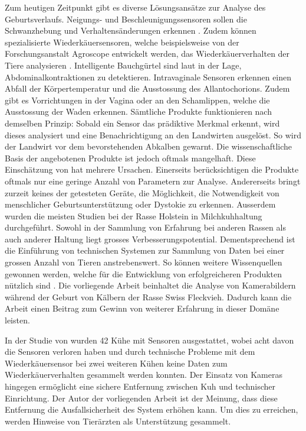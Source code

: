 Zum heutigen Zeitpunkt gibt es diverse Lösungsansätze zur Analyse des Geburtsverlaufs. Neigungs- und Beschleunigungssensoren sollen die Schwanzhebung und Verhaltensänderungen erkennen \citep[S. 354]{Saint-Dizier2015}. Zudem können spezialisierte Wiederkäuersensoren, welche beispielsweise von der Forschungsanstalt Agroscope entwickelt werden, das Wiederkäuerverhalten der Tiere analysieren \citep[S. 6936]{Pahl2014}. Intelligente Bauchgürtel sind laut \citep[S. 354]{Saint-Dizier2015} in der Lage, Abdominalkontraktionen zu detektieren. Intravaginale Sensoren erkennen einen Abfall der Körpertemperatur und die Ausstossung des Allantochorions. Zudem gibt es Vorrichtungen in der Vagina oder an den Schamlippen, welche die Ausstossung der Waden erkennen. Sämtliche Produkte funktionieren nach demselben Prinzip: Sobald ein Sensor das prädiktive Merkmal erkennt, wird dieses analysiert und eine Benachrichtigung an den Landwirten ausgelöst. So wird der Landwirt vor dem bevorstehenden Abkalben gewarnt. Die wissenschaftliche  Basis der angebotenen Produkte ist  jedoch oftmals mangelhaft. Diese Einschätzung von \citep[S. 354]{Saint-Dizier2015} hat mehrere Ursachen. Einerseits berücksichtigen die Produkte oftmals nur eine geringe Anzahl von Parametern zur Analyse. Andererseits bringt zurzeit keines der getesteten Geräte, die Möglichkeit, die Notwendigkeit von menschlicher Geburtsunterstützung oder Dystokie zu erkennen. Ausserdem wurden die meisten Studien bei der Rasse Holstein in Milchkuhhaltung durchgeführt. Sowohl in der Sammlung von Erfahrung bei anderen Rassen als auch anderer Haltung liegt grosses Verbesserungspotential. Dementsprechend ist die Einführung von technischen Systemen zur Sammlung von Daten bei einer grossen Anzahl von Tieren anstrebenswert. So können weitere Wissenquellen gewonnen werden, welche für die Entwicklung von erfolgreicheren Produkten nützlich sind \citep[S. 354]{Saint-Dizier2015}. Die vorliegende Arbeit beinhaltet die Analyse von Kamerabildern während der Geburt von Kälbern der Rasse Swiss Fleckvieh. Dadurch kann die Arbeit einen Beitrag zum Gewinn von weiterer Erfahrung in dieser Domäne leisten.

 In der Studie von \cite[S. 1542]{Ouellet2016} wurden 42 Kühe mit Sensoren ausgestattet, wobei acht davon die Sensoren verloren haben und durch technische Probleme mit dem Wiederkäuersensor bei zwei weiteren Kühen keine Daten zum Wiederkäuerverhalten gesammelt werden konnten. Der Einsatz von Kameras hingegen ermöglicht eine sichere Entfernung zwischen Kuh und technischer Einrichtung. Der Autor der vorliegenden Arbeit ist der Meinung, dass diese Entfernung die Ausfallsicherheit des System erhöhen kann. Um dies zu erreichen, werden Hinweise von Tierärzten als Unterstützung gesammelt.
 
